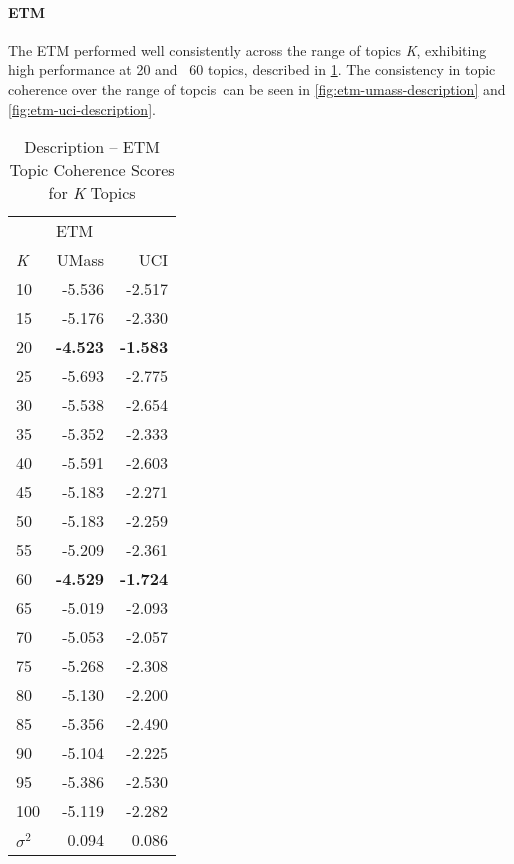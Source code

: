 \documentclass[letterpaper,12pt]{article}
\begin{document}
\paragraph{ETM}
The ETM performed well consistently across the range of topics \emph{K}, exhibiting high performance at 20 and \
60 topics, described in \ref{tab:etm_description_tc}. The consistency in topic coherence over the range of topcis\
can be seen in \ref{fig:etm-umass-description} and \ref{fig:etm-uci-description}.

\begin{table}
	\caption{\label{tab:etm_description_tc} Description -- ETM Topic Coherence Scores for \emph{K} Topics}
	\begin{center}
		\begin{tabular}{lrr}
			\toprule
			{} & \multicolumn{2}{l}{ETM} \\
			\emph{K} &  UMass &    UCI \\
			\midrule
			10  & -5.536 & -2.517 \\
			15  & -5.176 & -2.330 \\
			20  & \textbf{-4.523} & \textbf{-1.583} \\
			25  & -5.693 & -2.775 \\
			30  & -5.538 & -2.654 \\
			35  & -5.352 & -2.333 \\
			40  & -5.591 & -2.603 \\
			45  & -5.183 & -2.271 \\
			50  & -5.183 & -2.259 \\
			55  & -5.209 & -2.361 \\
			60  & \textbf{-4.529} & \textbf{-1.724} \\
			65  & -5.019 & -2.093 \\
			70  & -5.053 & -2.057 \\
			75  & -5.268 & -2.308 \\
			80  & -5.130 & -2.200 \\
			85  & -5.356 & -2.490 \\
			90  & -5.104 & -2.225 \\
			95  & -5.386 & -2.530 \\
			100 & -5.119 & -2.282 \\
			\midrule
			$\sigma^2$ & 0.094 & 0.086 \\
			\bottomrule
			\end{tabular}
	\end{center}
\end{table}
\end{document}
